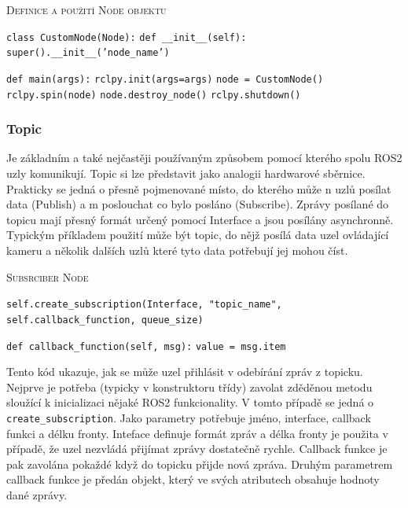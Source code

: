 \begin{algorithm}[h!]
	\label{}
	\caption{\textsc{Definice a použití Node objektu}}
	
	\DontPrintSemicolon
	\SetAlgoNoLine
	\SetNlSty{}{}{:}
	\SetNlSkip{-1.1em}
	
	\BlankLine \Indp\Indpp
	
	\texttt{class CustomNode(Node):}\;
	\Indp\Indp
	\texttt{def \_\_init\_\_(self):}\;
	\Indp\Indp
	\texttt{super().\_\_init\_\_('node\_name')}\;
	\Indm\Indm\Indm\Indm
	
	\BlankLine
	
	\texttt{def main(args):}\;
	\Indp\Indp
	\texttt{rclpy.init(args=args)}\;
	\texttt{node = CustomNode()}\;
	\texttt{rclpy.spin(node)}\;
	\texttt{node.destroy\_node()}\;
	\texttt{rclpy.shutdown()}\;
\end{algorithm}


\subsubsection*{Topic}
Je základním a také nejčastěji používaným způsobem pomocí kterého spolu ROS2 uzly komunikují. Topic si lze představit jako analogii hardwarové sběrnice. Prakticky se jedná o přesně pojmenované místo, do kterého může n uzlů posílat data (Publish) a m poslouchat co bylo posláno (Subscribe). Zprávy posílané do topicu mají přesný formát určený pomocí Interface a jsou posílány asynchronně. Typickým příkladem použití může být topic, do nějž posílá data uzel ovládající kameru a několik dalších uzlů které tyto data potřebují jej mohou číst. \cite{ros2_introduction}

\begin{algorithm}[h!]
	\label{}
	\caption{\textsc{Subsrciber Node}}
	
	\DontPrintSemicolon
	\SetAlgoNoLine
	\SetAlgoNlRelativeSize{-1}
	\SetNlSty{}{}{:}
	\SetNlSkip{-1.1em}
	
	\BlankLine \Indp\Indpp
	\texttt{self.create\_subscription(Interface, "topic\_name", self.callback\_function, queue\_size)}\;
	
	\BlankLine
	\texttt{def callback\_function(self, msg):}\;
	\Indp\Indp
	\texttt{value = msg.item}\;
\end{algorithm}
Tento kód ukazuje, jak se může uzel přihlásit v odebírání zpráv z topicku. Nejprve je potřeba (typicky v konstruktoru třídy) zavolat zděděnou metodu sloužící k inicializaci nějaké ROS2 funkcionality. V tomto případě se jedná o \verb|create_subscription|. Jako parametry potřebuje jméno, interface, callback funkci a délku fronty. Inteface definuje formát zpráv a délka fronty je použita v případě, že uzel nezvládá přijímat zprávy dostatečně rychle. Callback funkce je pak zavolána pokaždé když do topicku přijde nová zpráva. Druhým parametrem callback funkce je předán objekt, který ve svých atributech obsahuje hodnoty dané zprávy.

